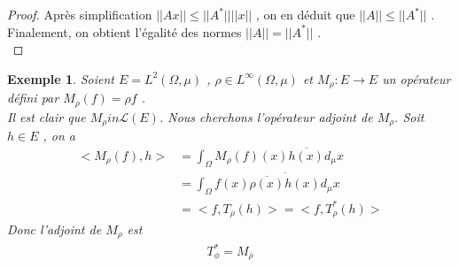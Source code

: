 \documentclass{report}
\newtheorem{Ex}{Exemple}[subsection]
\begin{document}
{\begin{proof}
Après simplification $||A x|| \le ||A^*|| ||x||$ , on en déduit que $||A|| \le ||A^*||$ .\\
Finalement, on obtient l'égalité des normes $||A|| = ||A^*||$ .\\
\end{proof}


\begin{Ex} Soient $E = L^2(\Omega, \mu)$ , $\rho \in L^{\infty}(\Omega, \mu)$ et $M_{\rho} : E \rightarrow E$ un opérateur défini par $M_{\rho}(f) = \rho f$ .\\
Il est clair que $M_{\rho} in \mathscr{L}(E)$. Nous cherchons l'opérateur adjoint de $M_{\rho}$. Soit $h \in 
E$ , on a 
	\begin{align*}				 < M_{\rho} (f), h > &= \int_{\Omega} M_{\rho}(f)(x) \overline{h(x)} d_{\mu} x\\
					 					  &= \int_{\Omega} f(x) \overline{\overline{\rho(x)} h(x)} d_{\mu} x \\
					 					  &= < f, T_{\overline{\rho}} (h) > = < f, T^*_{\rho}(h) > 
	\end{align*}
Donc l'adjoint de $M_{\rho}$ est 
	\begin{align*}
					 T^*_{\phi} = M_{\overline{\rho}} 
	\end{align*}
\end{Ex}


}
\end{document}
